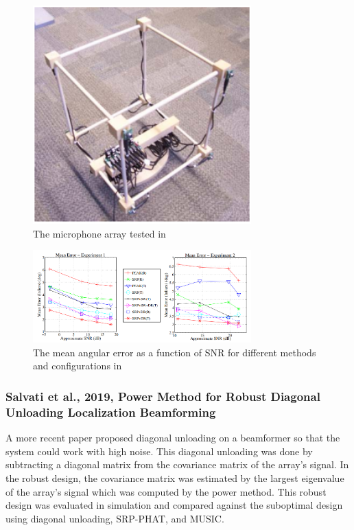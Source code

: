 \documentclass[notitlepage]{report}
\begin{document}
\begin{figure}[H]
\includegraphics[width=0.75\textwidth]{./badali_2009/array.png}
\centering
\caption{The microphone array tested in \cite{badali_evaluating_2009}}
\label{fig:badali_2009_array}
\centering
\end{figure}

\begin{figure}[H]
\includegraphics[width=0.75\textwidth]{./badali_2009/error_SNR.png}
\centering
\caption{The mean angular error as a function of SNR for different methods and configurations in \cite{badali_evaluating_2009}}
\label{fig:badali_2009_error_SNR}
\centering
\end{figure}

\subsubsection{Salvati et al., 2019, Power Method for Robust Diagonal Unloading Localization Beamforming}

A more recent paper \cite{salvati_power_2019} proposed diagonal unloading on a beamformer so that the system could work with high noise. This diagonal unloading was done by subtracting a diagonal matrix from the covariance matrix of the array's signal. In the robust design, the covariance matrix was estimated by the largest eigenvalue of the array's signal which was computed by the power method. This robust design was evaluated in simulation and compared against the suboptimal design using diagonal unloading, SRP-PHAT, and MUSIC. 
\end{document}
